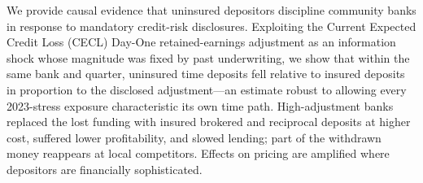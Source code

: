 
We provide causal evidence that uninsured depositors discipline community banks
in response to mandatory credit-risk disclosures.  Exploiting the Current
Expected Credit Loss (CECL) Day-One retained-earnings adjustment as an
information shock whose magnitude was fixed by past underwriting, we show that
within the same bank and quarter, uninsured time deposits fell relative to
insured deposits in proportion to the disclosed adjustment---an estimate robust
to allowing every 2023-stress exposure characteristic its own time path.
High-adjustment banks replaced the lost funding with insured brokered and
reciprocal deposits at higher cost, suffered lower profitability, and slowed
lending; part of the withdrawn money reappears at local competitors.  Effects
on pricing are amplified where depositors are financially sophisticated.

